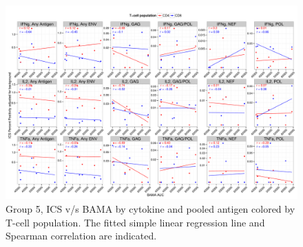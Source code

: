 \documentclass[11pt]{article}\usepackage[]{graphicx}\usepackage[]{color}
\makeatletter
\def\maxwidth{ %
  \ifdim\Gin@nat@width>\linewidth
    \linewidth
  \else
    \Gin@nat@width
  \fi
}
\newenvironment{knitrout}{}{} %
\makeatother
\begin{document}
\newpage
\pagestyle{lscape}
\begin{landscape}






\begin{figure}[H]
\begin{center}
\begin{knitrout}
\color{fgcolor}
\includegraphics[width=\maxwidth]{figure/corrplot_Grp5_BAMA_pooledAntigen-1} 

\end{knitrout}
\caption{Group 5, ICS v/s BAMA by cytokine and pooled antigen colored by T-cell population. The fitted simple linear regression line and Spearman correlation are indicated.}
\end{center}
\end{figure}



\end{landscape}
\end{document}
